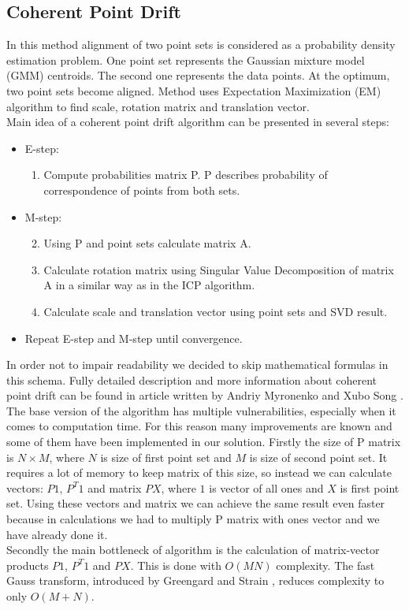 \documentclass[titlepage]{article}
\begin{document}
\subsection{Coherent Point Drift}

In this method alignment of two point sets is considered as a probability density estimation problem. One point set represents the Gaussian mixture model (GMM) centroids. The second one represents the data points. At the optimum, two point sets become aligned. Method uses Expectation Maximization (EM) algorithm to find scale, rotation matrix and translation vector.\\
Main idea of a coherent point drift algorithm can be presented in several steps:
\begin{itemize}[label={}]
\item E-step:
\begin{enumerate}
\item Compute probabilities matrix P. P describes probability of correspondence of points from both sets.
\end{enumerate}
\item M-step: 
\begin{enumerate}
\setcounter{enumi}{1}
\item Using P and point sets calculate matrix A.
\item Calculate rotation matrix using Singular Value Decomposition of matrix A in a similar way as in the ICP algorithm.
\item Calculate scale and translation vector using point sets and SVD result.
\end{enumerate}
\item Repeat E-step and M-step until convergence.
\end{itemize}
In order not to impair readability we decided to skip mathematical formulas in this schema. Fully detailed description and more information about coherent point drift can be found in article written by Andriy Myronenko and Xubo Song \cite{cpd}.\\
The base version of the algorithm has multiple vulnerabilities, especially when it comes to computation time.
For this reason many improvements are known and some of them have been implemented in our solution. Firstly the size of P matrix is $N \times M$, where $N$ is size of first point set and $M$ is size of second point set. It requires a lot of memory to keep matrix of this size, so instead we can calculate vectors: $P1$, $P^T 1$ and matrix $PX$, where $1$ is vector of all ones and $X$ is first point set. Using these vectors and matrix we can achieve the same result even faster because in calculations we had to multiply P matrix with ones vector and we have already done it.\\
Secondly the main bottleneck of algorithm is the calculation of matrix-vector products $P1$, $P^T1$ and $PX$. This is done with $O(MN)$ complexity. The fast Gauss transform, introduced by Greengard and Strain \cite{fgt}, reduces complexity to only $O(M+N)$.
\end{document}
